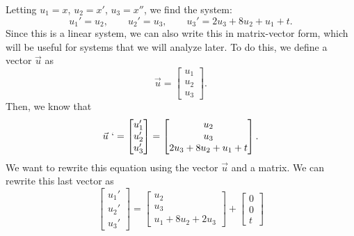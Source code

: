\documentclass{ximera}
\begin{document}
\begin{exampleSol}
    Letting $u_1 = x$, $u_2 = x'$, $u_3 = x''$, we find the system:
    \begin{equation*}
        u_1' = u_2, \qquad u_2' = u_3, \qquad u_3' = 2u_3 + 8u_2 + u_1 + t.
    \end{equation*}
    Since this is a linear system, we can also write this in matrix-vector form, which will be useful for systems that we will analyze later. To do this, we define a vector $\vec{u}$ as
    \begin{equation*}
        \vec{u} = 
        \begin{bmatrix} 
            u_1 \\ 
            u_2 \\ 
            u_3 
        \end{bmatrix}.
    \end{equation*}
    Then, we know that
    \begin{equation*}
        \vec{u}\ ` = 
        \begin{bmatrix} 
            u_1'\\ 
            u_2'\\
            u_3' 
        \end{bmatrix} = 
        \begin{bmatrix} 
            u_2 \\ 
            u_3 \\ 
            2u_3 + 8u_2 + u_1 + t 
        \end{bmatrix}.
    \end{equation*}
    We want to rewrite this equation using the vector $\vec{u}$ and a matrix. We can rewrite this last vector as 
    \begin{equation*}
        \begin{bmatrix} 
            u_1'\\ 
            u_2'\\ 
            u_3' 
        \end{bmatrix} = 
        \begin{bmatrix} 
            u_2 \\ 
            u_3 \\ 
            u_1 + 8u_2 + 2u_3 
        \end{bmatrix} + 
        \begin{bmatrix}
            0 \\ 
            0 \\ 
            t 
        \end{bmatrix}

\end{equation*}
\end{exampleSol}
\end{document}
